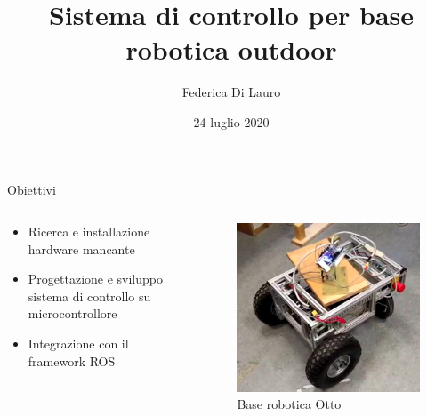\documentclass{beamer}
\author{Federica Di Lauro}
\title{Sistema di controllo per base robotica outdoor}
\date{24 luglio 2020}
\begin{document}
\titlepageframe %

\begin{tframe}{Obiettivi}

\begin{columns}
    \begin{column}{0.45\textwidth}
        \begin{itemize}
            \item Ricerca e installazione hardware mancante
            \item Progettazione e sviluppo sistema di controllo su microcontrollore
            \item Integrazione con il framework ROS
        \end{itemize}
    \end{column}

    \begin{column}{0.45\textwidth}
        \begin{center}
            \begin{figure}
                \centering
                \includegraphics[width=0.9\columnwidth]{img/otto2.png}
                \caption{Base robotica Otto}
            \end{figure}
        \end{center}
    \end{column}
\end{columns}
\end{tframe}
\end{document}

